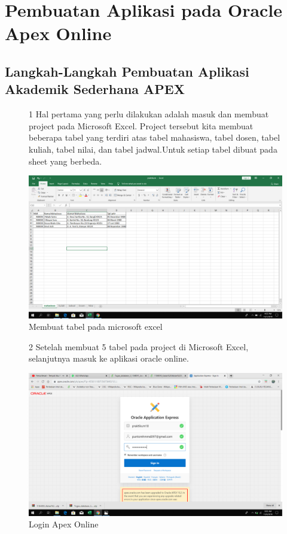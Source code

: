 \chapter{Pembuatan Aplikasi pada Oracle Apex Online}

\section{Langkah-Langkah Pembuatan Aplikasi Akademik Sederhana APEX}

\begin{enumerate}

\begin{figure}[!htbp]
\item[1]Hal pertama yang perlu dilakukan adalah masuk dan membuat project pada Microsoft Excel. Project tersebut kita membuat beberapa tabel yang terdiri atas tabel mahasiswa, tabel dosen, tabel kuliah, tabel nilai, dan tabel jadwal.Untuk setiap tabel dibuat pada sheet yang berbeda.

    \begin{center}
    \includegraphics[scale=0.2]{figures/1.png}
    \caption{Membuat tabel pada microsoft excel}
    \end{center}
    \end{figure}

\begin{figure}[!htbp]
\item[2]Setelah membuat 5 tabel pada project di Microsoft Excel, selanjutnya masuk ke aplikasi oracle online.

    \begin{center}
    \includegraphics[scale=0.2]{figures/29.png}
     \caption{Login Apex Online}
    \end{center}   
    \end{figure}


\end{enumerate}
